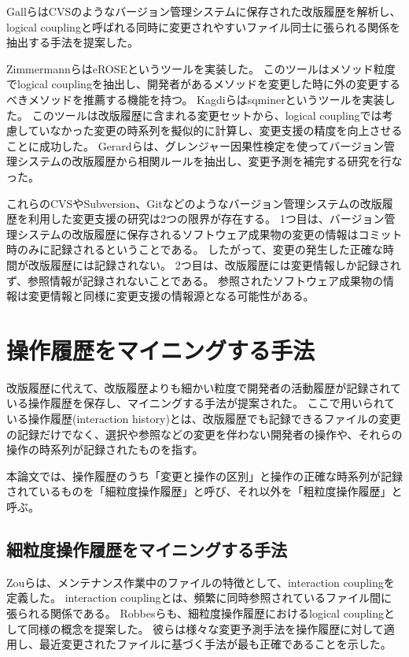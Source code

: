 \documentclass[a4paper]{jsbook}
\begin{document}
Gallら\cite{738508}はCVSのようなバージョン管理システムに保存された改版履歴を解析し、logical couplingと呼ばれる同時に変更されやすいファイル同士に張られる関係を抽出する手法を提案した。

ZimmermannらはeROSEというツール\cite{Zimmermann:2005}を実装した。
このツールはメソッド粒度でlogical couplingを抽出し、開発者があるメソッドを変更した時に外の変更するべきメソッドを推薦する機能を持つ。
Kagdiらはsqminerというツール\cite{Kagdi:2006}を実装した。
このツールは改版履歴に含まれる変更セットから、logical couplingでは考慮していなかった変更の時系列を擬似的に計算し、変更支援の精度を向上させることに成功した。
Gerardら\cite{5609732}は、グレンジャー因果性検定を使ってバージョン管理システムの改版履歴から相関ルールを抽出し、変更予測を補完する研究を行なった。

これらのCVSやSubversion、Gitなどのようなバージョン管理システムの改版履歴を利用した変更支援の研究は2つの限界が存在する。
1つ目は、バージョン管理システムの改版履歴に保存されるソフトウェア成果物の変更の情報はコミット時のみに記録されるということである。
したがって、変更の発生した正確な時間が改版履歴には記録されない。
2つ目は、改版履歴には変更情報しか記録されず、参照情報が記録されないことである。
参照されたソフトウェア成果物の情報は変更情報と同様に変更支援の情報源となる可能性がある。
\section{操作履歴をマイニングする手法}
改版履歴に代えて、改版履歴よりも細かい粒度で開発者の活動履歴が記録されている操作履歴を保存し、マイニングする手法が提案された\cite{Hill:1992}。
ここで用いられている操作履歴(interaction history)とは、改版履歴でも記録できるファイルの変更の記録だけでなく、選択や参照などの変更を伴わない開発者の操作や、それらの操作の時系列が記録されたものを指す。

本論文では、操作履歴のうち「変更と操作の区別」と操作の正確な時系列が記録されているものを「細粒度操作履歴」と呼び、それ以外を「粗粒度操作履歴」と呼ぶ。
\subsection{細粒度操作履歴をマイニングする手法}
Zouら\cite{4268248}は、メンテナンス作業中のファイルの特徴として、interaction couplingを定義した。
interaction couplingとは、頻繁に同時参照されているファイル間に張られる関係である。
Robbesら\cite{Robbes:2008}も、細粒度操作履歴におけるlogical couplingとして同様の概念を提案した。
彼らは様々な変更予測手法を操作履歴に対して適用し、最近変更されたファイルに基づく手法が最も正確であることを示した\cite{5463278}。
\end{document}

